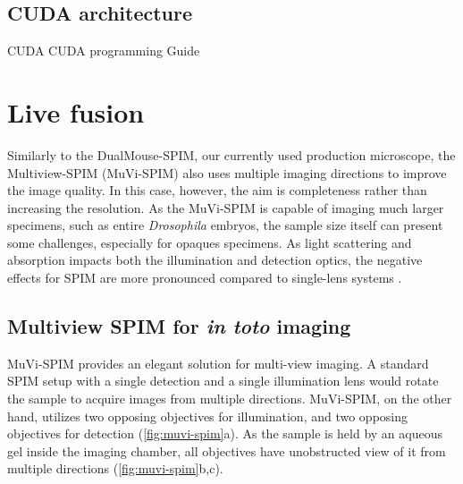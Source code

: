   \subsection{CUDA architecture}

    CUDA \cite{nickolls_scalable_2008}
    CUDA programming Guide \cite{nvidia_cuda_2015}




\section{Live fusion}

Similarly to the DualMouse-SPIM, our currently used production microscope, the Multiview-SPIM (MuVi-SPIM) \cite{krzic_multiview_2012} also uses multiple imaging directions to improve the image quality. In this case, however, the aim is completeness rather than increasing the resolution. As the MuVi-SPIM is capable of imaging much larger specimens, such as entire \textit{Drosophila} embryos, the sample size itself can present some challenges, especially for opaques specimens. As light scattering and absorption impacts both the illumination and detection optics, the negative effects for SPIM are more pronounced compared to single-lens systems \cite{de_medeiros_deep_2016}.




\subsection{Multiview SPIM for \textit{in toto} imaging}

MuVi-SPIM  provides an elegant solution for multi-view imaging. A standard SPIM setup with a single detection and a single illumination lens would rotate the sample to acquire images from multiple directions. MuVi-SPIM, on the other hand, utilizes two opposing objectives for illumination, and two opposing objectives for detection (\autoref{fig:muvi-spim}a). As the sample is held by an aqueous gel inside the imaging chamber, all objectives have unobstructed view of it from multiple directions (\autoref{fig:muvi-spim}b,c).


